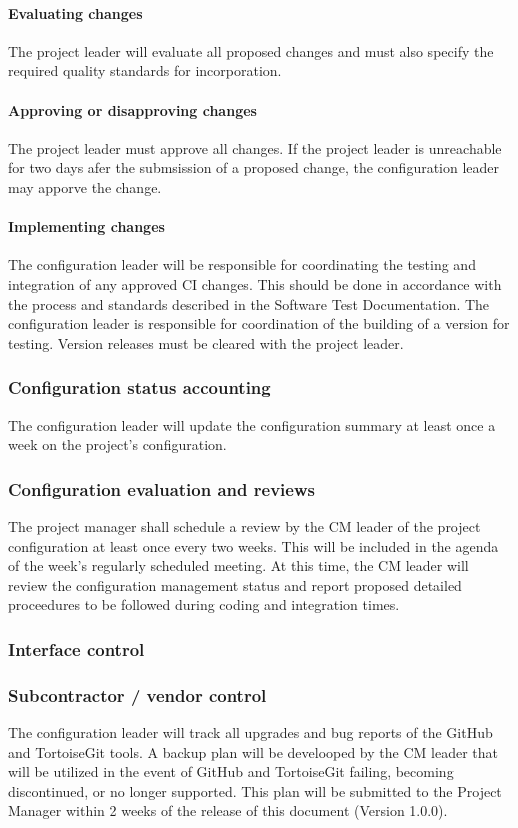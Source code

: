 \documentclass{scrartcl}
\begin{document}
\paragraph{Evaluating changes}
The project leader will evaluate all proposed changes and must also specify the required quality standards for incorporation.
\paragraph{Approving or disapproving changes}
The project leader must approve all changes.  If the project leader is unreachable for two days afer the submsission of a proposed change, the configuration leader may apporve the change.
\paragraph{Implementing changes}
The configuration leader will be responsible for coordinating the testing and integration of any approved CI changes.  This should be done in accordance with the process  and standards described in the Software Test Documentation.  The configuration leader is responsible for coordination of the building of a version for testing.  Version releases must be cleared with the project leader.
\subsubsection{Configuration status accounting}
The configuration leader will update the configuration summary at least once a week on the project's configuration.
\subsubsection{Configuration evaluation and reviews}
The project manager shall schedule a review by the CM leader of the project configuration at least once every two weeks.  This will be included in the agenda of the week's regularly scheduled meeting.  At this time, the CM leader will review the configuration management status and report proposed detailed proceedures to be followed during coding and integration times.
\subsubsection{Interface control}

\subsubsection{Subcontractor / vendor control}
The configuration leader will track all upgrades and bug reports of the GitHub and TortoiseGit tools.  A backup plan will be develooped by the CM leader that will be utilized in the event of GitHub and TortoiseGit failing, becoming discontinued, or no longer supported.  This plan will be submitted to the Project Manager within 2 weeks of the release of this document (Version 1.0.0).
\end{document}
